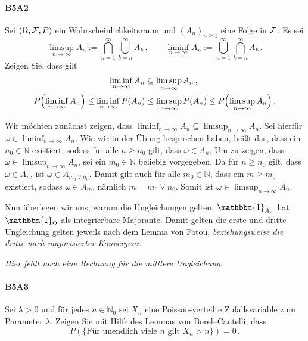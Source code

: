 \documentclass{article}
\begin{document}
\paragraph{B5A2}
Sei $(\Omega,{\cal F},P)$ ein Wahrscheinlichkeitsraum und $(A_n)_{n\geq 1}$ eine Folge in ${\cal F}$.
Es sei
\[
  \limsup_{n\to\infty}A_n:=\bigcap_{n=1}^\infty\bigcup_{k=n}^\infty A_k\,,\qquad\liminf_{n\to\infty}A_n:=\bigcup_{n=1}^\infty\bigcap_{k=n}^\infty A_k\,.
\]
Zeigen Sie, dass gilt
\begin{align*}
  \liminf_{n\to\infty}A_n
  &\subseteq\limsup_{n\to\infty}A_n\,,\\
  P\Bigl(\liminf_{n\to\infty}A_n\Bigr)\leq \liminf_{n\to\infty}P(A_n)
  &\leq\limsup_{n\to\infty}P(A_n)\leq P\Bigl(\limsup_{n\to\infty}A_n\Bigr)\,.
\end{align*}

Wir möchten zunächst zeigen, dass $\liminf_{n\to\infty}A_n\subseteq\limsup_{n\to\infty}A_n$.
Sei hierfür $\omega\in\liminf_{n\to\infty}A_n$. Wie wir in der Übung besprochen haben, heißt das, dass ein $n_0\in\mathbb{N}$ existiert, sodass für alle $n\geq n_0$ gilt, dass $\omega\in A_n$.
Um zu zeigen, dass $\omega\in\limsup_{n\to\infty}A_n$, sei ein $m_0\in\mathbb{N}$ beliebig vorgegeben.
Da für $n\geq n_0$ gilt, dass $\omega\in A_n$, ist $\omega\in A_{m_0\vee n_0}$.
Damit gilt auch für alle $m_0\in\mathbb{N}$, dass ein $m\geq m_0$ existiert, sodass $\omega\in A_m$, nämlich $m=m_0\vee n_0$.
Somit ist $\omega\in\limsup_{n\to\infty}A_n$.

Nun überlegen wir uns, warum die Ungleichungen gelten.
$\mathbbm{1}_{A_n}$ hat $\mathbbm{1}_\Omega$ als integrierbare Majorante.
Damit gelten die erste und dritte Ungleichung gelten jeweils nach dem Lemma von Fatou, \emph{beziehungsweise die dritte nach majorisierter Konvergenz}.

\emph{Hier fehlt noch eine Rechnung für die mittlere Ungleichung.}
\newpage

\paragraph{B5A3}
Sei $\lambda>0$ und für jedes $n\in\mathbb{N}_0$ sei $X_n$ eine Poisson-verteilte Zufallsvariable zum Parameter $\lambda$.
Zeigen Sie mit Hilfe des Lemmas von Borel--Cantelli, dass
\[
  P(\{\text{Für unendlich viele $n$ gilt $X_n>n$}\})=0\,.
\]
\end{document}

